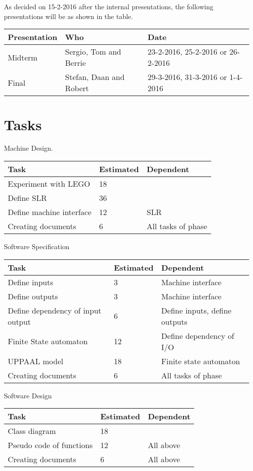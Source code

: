 \documentclass[a4paper,oneside,11pt]{article}
\begin{document}
As decided on 15-2-2016 after the internal presentations, the following presentations will be as shown in the table.\\
\begin{center}
\begin{tabular}{|l|l|l|}
\hline
Presentation & Who & Date\\
\hline
Midterm & Sergio, Tom and Berrie & 23-2-2016, 25-2-2016 or 26-2-2016\\
\hline
Final & Stefan, Daan and Robert & 29-3-2016, 31-3-2016 or 1-4-2016\\
\hline
\end{tabular}
\end{center}

\section{Tasks}
Machine Design.\\
\begin{center}
\begin{tabular}{|l|l|l|}
\hline
Task & Estimated & Dependent\\
\hline
Experiment with LEGO & 18 & \\
\hline
Define SLR & 36 & \\
\hline
Define machine interface & 12 & SLR\\
\hline
Creating documents & 6 & All tasks of phase\\
\hline
\end{tabular}
\end{center}
Software Specification
\begin{center}
\begin{tabular}{|l|l|l|}
\hline
Task & Estimated & Dependent\\
\hline
Define inputs & 3 & Machine interface\\
\hline
Define outputs & 3 & Machine interface\\
\hline
Define dependency of input output & 6 & Define inputs, define outputs\\
\hline
Finite State automaton & 12 & Define dependency of I/O\\
\hline
UPPAAL model & 18 &  Finite state automaton\\
\hline
Creating documents & 6 & All tasks of phase\\
\hline
\end{tabular}
\end{center}
Software Design
\begin{center}
\begin{tabular}{|l|l|l|}
\hline
Task & Estimated & Dependent\\
\hline
Class diagram & 18 & \\ \hline
Pseudo code of functions & 12 & All above\\ \hline
Creating documents & 6 & All above\\
\hline
\end{tabular}
\end{center}
\end{document}
